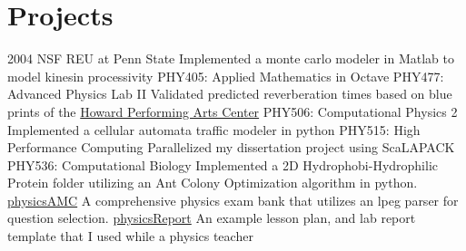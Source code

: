 \documentclass[]{twentysecondcv}
\begin{document}
\section{Projects}
\begin{twentyshort}
  \twentyitemshort
 {2004 NSF REU at Penn State}
     {Implemented a monte carlo modeler in Matlab to model kinesin processivity}
    \twentyitemshort
    {PHY405: Applied Mathematics}
    {in Octave}
    \twentyitemshort
    {PHY477: Advanced Physics Lab II}
        {Validated predicted reverberation times based on blue prints of the \href{www.howard.andrews.edu}{Howard Performing Arts Center}}
    \twentyitemshort
    {PHY506: Computational Physics 2}
        {Implemented a cellular automata traffic modeler in python}
    \twentyitemshort
    {PHY515: High Performance Computing}
        {Parallelized my dissertation project using ScaLAPACK}
    \twentyitemshort
    {PHY536: Computational Biology}
        {Implemented a 2D Hydrophobi-Hydrophilic Protein folder utilizing an Ant Colony Optimization algorithm in python.}
    \twentyitemshort
    {\href{https://github.com/jphafner/physicsAMC}{physicsAMC}}
        {A comprehensive physics exam bank that utilizes an lpeg parser for question selection.}
    \twentyitemshort
    {\href{https://github.com/jphafner/physicsReport}{physicsReport}}
        {An example lesson plan, and lab report template that I used while a physics teacher}
\end{twentyshort}

\end{document}
